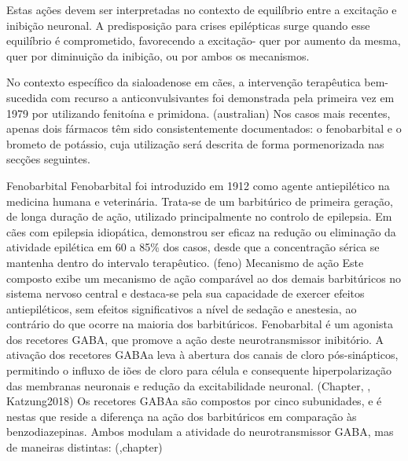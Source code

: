 Estas ações devem ser interpretadas no contexto de equilíbrio entre a excitação e inibição neuronal. A predisposição para crises epilépticas surge quando esse equilíbrio é comprometido, favorecendo a excitação- quer por aumento da mesma, quer por diminuição da inibição, ou por ambos os mecanismos.\cite{Katzung2018}


No contexto específico da sialoadenose em cães, a intervenção terapêutica bem-sucedida com recurso a anticonvulsivantes foi demonstrada pela primeira vez em 1979 por \cite{Kelly2017} utilizando fenitoína e primidona. (australian) Nos casos mais recentes, apenas dois fármacos têm sido consistentemente documentados: o fenobarbital e o brometo de potássio, cuja utilização será descrita de forma pormenorizada nas secções seguintes.


Fenobarbital
Fenobarbital foi introduzido em 1912 como agente antiepilético na medicina humana e veterinária. \cite{Yasiry2012}\cite{Jukier2023} Trata-se de um barbitúrico de primeira geração, de longa duração de ação, utilizado principalmente no controlo de epilepsia. \cite{Papich2021}\cite{Scott2021} Em cães com epilepsia idiopática, demonstrou ser eficaz na redução ou eliminação da atividade epilética em 60 a 85\% dos casos, desde que a concentração sérica se mantenha dentro do intervalo terapêutico. (feno)
Mecanismo de ação 
Este composto exibe um mecanismo de ação comparável ao dos demais barbitúricos no sistema nervoso central e destaca-se pela sua capacidade de exercer efeitos antiepiléticos, sem efeitos significativos a nível de sedação e anestesia, ao contrário do que ocorre na maioria dos barbitúricos. \cite{Papich2021}
 Fenobarbital é um agonista dos recetores GABA, que promove a ação deste neurotransmissor inibitório. A ativação dos recetores GABAa leva à abertura dos canais de cloro pós-sinápticos, permitindo o influxo de iões de cloro para célula e consequente hiperpolarização das membranas neuronais e redução da excitabilidade neuronal. (Chapter, \cite{Papich2021}, Katzung2018) Os recetores GABAa são compostos por cinco subunidades, e é nestas que reside a diferença na ação dos barbitúricos em comparação às benzodiazepinas. Ambos modulam a atividade do neurotransmissor GABA, mas de maneiras distintas: (\cite{Trinka2023},chapter)

